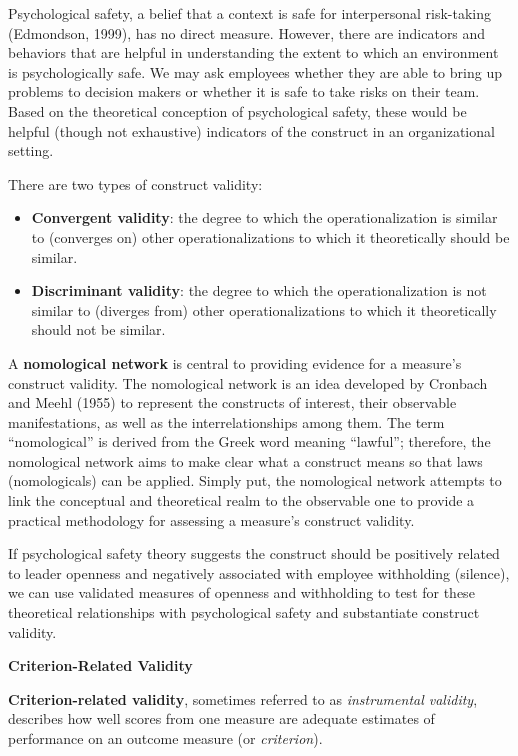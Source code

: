 \documentclass[]{book}
\providecommand{\tightlist}{%
  \setlength{\itemsep}{0pt}\setlength{\parskip}{0pt}}
\begin{document}
Psychological safety, a belief that a context is safe for interpersonal risk-taking (Edmondson, 1999), has no direct measure. However, there are indicators and behaviors that are helpful in understanding the extent to which an environment is psychologically safe. We may ask employees whether they are able to bring up problems to decision makers or whether it is safe to take risks on their team. Based on the theoretical conception of psychological safety, these would be helpful (though not exhaustive) indicators of the construct in an organizational setting.

There are two types of construct validity:

\begin{itemize}
\tightlist
\item
  \textbf{Convergent validity}: the degree to which the operationalization is similar to (converges on) other operationalizations to which it theoretically should be similar.
\item
  \textbf{Discriminant validity}: the degree to which the operationalization is not similar to (diverges from) other operationalizations to which it theoretically should not be similar.
\end{itemize}

A \textbf{nomological network} is central to providing evidence for a measure's construct validity. The nomological network is an idea developed by Cronbach and Meehl (1955) to represent the constructs of interest, their observable manifestations, as well as the interrelationships among them. The term ``nomological'' is derived from the Greek word meaning ``lawful''; therefore, the nomological network aims to make clear what a construct means so that laws (nomologicals) can be applied. Simply put, the nomological network attempts to link the conceptual and theoretical realm to the observable one to provide a practical methodology for assessing a measure's construct validity.

If psychological safety theory suggests the construct should be positively related to leader openness and negatively associated with employee withholding (silence), we can use validated measures of openness and withholding to test for these theoretical relationships with psychological safety and substantiate construct validity.

\textbf{Criterion-Related Validity}

\textbf{Criterion-related validity}, sometimes referred to as \emph{instrumental validity}, describes how well scores from one measure are adequate estimates of performance on an outcome measure (or \emph{criterion}).
\end{document}
